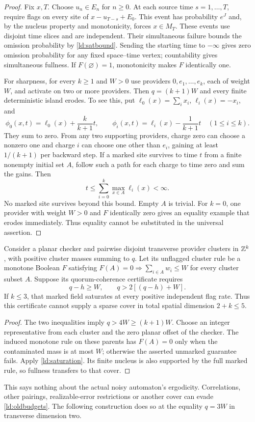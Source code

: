 \begin{proof}
Fix $x,T$. Choose $u_n\in E_n$ for $n\ge0$. At each source time $s=1,\ldots,T$, require flags on every site of $x-u_{T-s}+E_0$. This event has probability $e^J$ and, by the nucleus property and monotonicity, forces $x\in M_T$. These events use disjoint time slices and are independent. Their simultaneous failure bounds the omission probability by \eqref{ld:satbound}. Sending the starting time to $-\infty$ gives zero omission probability for any fixed space--time vertex; countability gives simultaneous fullness. If $F(\varnothing)=1$, monotonicity makes $F$ identically one.

For sharpness, for every $k\ge1$ and $W>0$ use providers $0,e_1,\ldots,e_k$, each of weight $W$, and activate on two or more providers. Then $q=(k+1)W$ and every finite deterministic island erodes. To see this, put $\ell_0(x)=\sum_i x_i$, $\ell_i(x)=-x_i$, and
\[
 \phi_0(x,t)=\ell_0(x)+\frac{k}{k+1}t,\qquad
 \phi_i(x,t)=\ell_i(x)-\frac{1}{k+1}t\quad(1\le i\le k).
\]
They sum to zero. From any two supporting providers, charge zero can choose a nonzero one and charge $i$ can choose one other than $e_i$, gaining at least $1/(k+1)$ per backward step. If a marked site survives to time $t$ from a finite nonempty initial set $A$, follow such a path for each charge to time zero and sum the gains. Then
\[
 t\le\sum_{i=0}^k\max_{x\in A}\ell_i(x)<\infty.
\]
No marked site survives beyond this bound. Empty $A$ is trivial. For $k=0$, one provider with weight $W>0$ and $F$ identically zero gives an equality example that erodes immediately. Thus equality cannot be substituted in the universal assertion.
\end{proof}

\begin{corollary}\label{ld:budget-obstruction}
Consider a planar checker and pairwise disjoint transverse provider clusters in $\mathbb{Z}^k$, with positive cluster masses summing to $q$. Let its unflagged cluster rule be a monotone Boolean $F$ satisfying $F(A)=0\Rightarrow\sum_{i\in A}w_i\le W$ for every cluster subset $A$. Suppose its quorum-coherence certificate requires
\begin{equation}\label{ld:oldbudgets}
 q-h\ge W,\qquad q>2[(q-h)+W].
\end{equation}
If $k\le3$, that marked field saturates at every positive independent flag rate. Thus this certificate cannot supply a sparse cover in total spatial dimension $2+k\le5$.
\end{corollary}
\begin{proof}
The two inequalities imply $q>4W\ge(k+1)W$. Choose an integer representative from each cluster and the zero planar offset of the checker. The induced monotone rule on these parents has $F(A)=0$ only when the contaminated mass is at most $W$; otherwise the asserted unmarked guarantee fails. Apply \cref{ld:saturation}. Its finite nucleus is also supported by the full marked rule, so fullness transfers to that cover.
\end{proof}
This says nothing about the actual noisy automaton's ergodicity. Correlations, other pairings, realizable-error restrictions or another cover can evade \eqref{ld:oldbudgets}. The following construction does so at the equality $q=3W$ in transverse dimension two.

